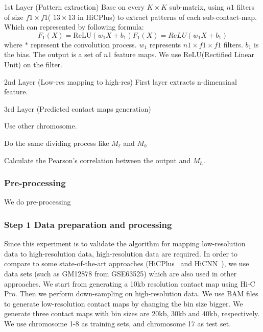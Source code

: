 \documentclass[a4paper,12pt]{article}
\begin{document}
1st Layer (Pattern extraction)
Base on every $K \times K$ sub-matrix, using $n1$ filters of size $f1 \times f1$( $13 \times 13$ in HiCPlus)
to extract patterns of each sub-contact-map. Which can represented by following formula:
\begin{equation*}
    F_1(X) = \mathrm{ReLU}(w_1 X + b_1)
    F_1(X) = \mathit{ReLU}(w_1 X + b_1)
\end{equation*}
where $*$ represent the convolution process. 
$w_1$ represents $n1 \times f1 \times f1$ filters. $b_1$ is the bias. The output is a set of $n1$ feature maps. We use ReLU(Rectified Linear Unit) on the filter.
 

2nd Layer (Low-res mapping to high-res)
First layer extracts n-dimensinal feature.


3rd Layer (Predicted contact maps generation)


Use other chromosome. 

Do the same dividing process like $M_\ell$ and $M_h$

Calculate the Pearson's correlation between the output and $M_h$.






\subsubsection*{Pre-processing}
We do pre-processing
\subsubsection*{Step 1 Data preparation and processing}
Since this experiment is to validate the algorithm for mapping low-resolution data to high-resolution data, 
high-resolution data are required. 
In order to compare to some state-of-the-art approaches (HiCPlus~\cite{Zhang2018} and HiCNN~\cite{Liu2019}), 
we use data sets (such as GM12878 from GSE63525) which are also used in other approaches. 
We start from generating a 10kb resolution contact map 
using Hi-C Pro. 
Then we perform down-sampling on high-resolution data. 
We use BAM files to generate low-resolution contact maps by changing the bin size bigger. 
We generate three contact maps with bin sizes are 20kb, 30kb and 40kb, respectively. 
We use chromosome 1-8 as training sets, and chromosome 17 as test set.
\end{document}
